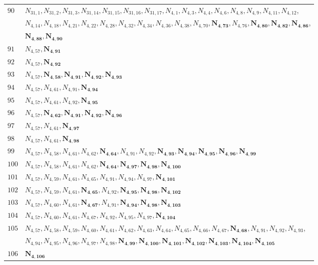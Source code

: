 \documentclass{amsart}
\theoremstyle{plain}
\theoremstyle{definition}
\theoremstyle{remark}
\begin{document}
{\begin{longtable}{ll}
$90$ & $N_{31,1}, N_{31,2}, N_{31,3}, N_{31,14}, N_{31,15}, N_{31,16}, N_{31,17}, N_{4,1}, N_{4,3}, N_{4,4}, N_{4,6}, N_{4,8}, N_{4,9}, N_{4,11}, N_{4,12}$,\\ 
& $N_{4,14}, N_{4,18}, N_{4,21}, N_{4,22}, N_{4,28}, N_{4,32}, N_{4,34}, N_{4,36}, N_{4,38}, N_{4,70}, \bm{N_{4,73}}, N_{4,76}, \bm{N_{4,80}}, \bm{N_{4,82}}, \bm{N_{4,86}}$,\\ 
& $\bm{N_{4,88}}, \bm{N_{4,90}}$\\
$91$ & $N_{4,57}, \bm{N_{4,91}}$\\
$92$ & $N_{4,57}, \bm{N_{4,92}}$\\
$93$ & $N_{4,57}, \bm{N_{4,58}}, \bm{N_{4,91}}, \bm{N_{4,92}}, \bm{N_{4,93}}$\\
$94$ & $N_{4,57}, N_{4,61}, N_{4,91}, \bm{N_{4,94}}$\\
$95$ & $N_{4,57}, N_{4,61}, N_{4,92}, \bm{N_{4,95}}$\\
$96$ & $N_{4,57}, \bm{N_{4,62}}, \bm{N_{4,91}}, \bm{N_{4,92}}, \bm{N_{4,96}}$\\
$97$ & $N_{4,57}, N_{4,61}, \bm{N_{4,97}}$\\
$98$ & $N_{4,57}, N_{4,61}, \bm{N_{4,98}}$\\
$99$ & $N_{4,57}, N_{4,58}, N_{4,61}, N_{4,62}, \bm{N_{4,64}}, N_{4,91}, N_{4,92}, \bm{N_{4,93}}, \bm{N_{4,94}}, \bm{N_{4,95}}, \bm{N_{4,96}}, \bm{N_{4,99}}$\\
$100$ & $N_{4,57}, N_{4,58}, N_{4,61}, N_{4,62}, \bm{N_{4,64}}, \bm{N_{4,97}}, \bm{N_{4,98}}, \bm{N_{4,100}}$\\
$101$ & $N_{4,57}, N_{4,59}, N_{4,61}, N_{4,65}, N_{4,91}, N_{4,94}, N_{4,97}, \bm{N_{4,101}}$\\
$102$ & $N_{4,57}, N_{4,59}, N_{4,61}, \bm{N_{4,65}}, N_{4,92}, \bm{N_{4,95}}, \bm{N_{4,98}}, \bm{N_{4,102}}$\\
$103$ & $N_{4,57}, N_{4,60}, N_{4,61}, \bm{N_{4,67}}, N_{4,91}, \bm{N_{4,94}}, \bm{N_{4,98}}, \bm{N_{4,103}}$\\
$104$ & $N_{4,57}, N_{4,60}, N_{4,61}, N_{4,67}, N_{4,92}, N_{4,95}, N_{4,97}, \bm{N_{4,104}}$\\
$105$ & $N_{4,57}, N_{4,58}, N_{4,59}, N_{4,60}, N_{4,61}, N_{4,62}, N_{4,63}, N_{4,64}, N_{4,65}, N_{4,66}, N_{4,67}, \bm{N_{4,68}}, N_{4,91}, N_{4,92}, N_{4,93}$,\\ 
& $N_{4,94}, N_{4,95}, N_{4,96}, N_{4,97}, N_{4,98}, \bm{N_{4,99}}, \bm{N_{4,100}}, \bm{N_{4,101}}, \bm{N_{4,102}}, \bm{N_{4,103}}, \bm{N_{4,104}}, \bm{N_{4,105}}$\\
$106$ & $\bm{N_{4,106}}$\\

\end{longtable}}
\end{document}
